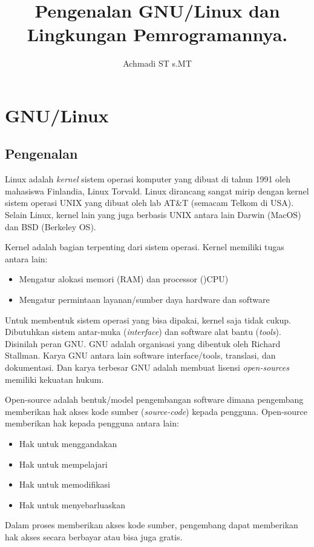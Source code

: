 \documentclass[12pt,]{book}
\title{\Large \bf
	Pengenalan GNU/Linux dan Lingkungan Pemrogramannya.
}
\author{Achmadi ST s.MT}
\date{}
\begin{document}
	\maketitle
	\thispagestyle{empty}
	\pagestyle{empty}
	
	\newpage
	\tableofcontents
	
	\newpage
	\section{GNU/Linux}
	
	\subsection{Pengenalan}
	\hspace{10pt} Linux adalah \textit{kernel} sistem operasi komputer yang dibuat di tahun 1991 oleh mahasiswa Finlandia, Linux Torvald.
	Linux dirancang sangat mirip dengan kernel sistem operasi UNIX yang dibuat oleh lab AT\&T (semacam Telkom di USA).
	Selain Linux, kernel lain yang juga berbasis UNIX antara lain Darwin (MacOS) dan BSD (Berkeley OS).
	
	Kernel adalah bagian terpenting dari sistem operasi.
	Kernel memiliki tugas antara lain:
	\begin{itemize}
		\item Mengatur alokasi memori (RAM) dan processor ()CPU)
		\item Mengatur permintaan layanan/sumber daya hardware dan software
	\end{itemize}
	
	Untuk membentuk sistem operasi yang bisa dipakai, kernel saja tidak cukup.
	Dibutuhkan sistem antar-muka (\textit{interface}) dan software alat bantu (\textit{tools}).
	Disinilah peran GNU. 
	GNU adalah organisasi yang dibentuk oleh Richard Stallman.
	Karya GNU antara lain software interface/tools, translasi, dan dokumentasi.
	Dan karya terbesar GNU adalah membuat lisensi \textit{open-sources} memiliki kekuatan hukum.
	
	Open-source adalah bentuk/model pengembangan software dimana pengembang memberikan hak akses kode sumber (\textit{source-code}) kepada pengguna.
	Open-source memberikan hak kepada pengguna antara lain:
	\begin{itemize}
		\item Hak untuk menggandakan
		\item Hak untuk mempelajari
		\item Hak untuk memodifikasi
		\item Hak untuk menyebarluaskan
	\end{itemize}
	Dalam proses memberikan akses kode sumber, pengembang dapat memberikan hak akses secara berbayar atau bisa juga gratis.
	
\end{document}
